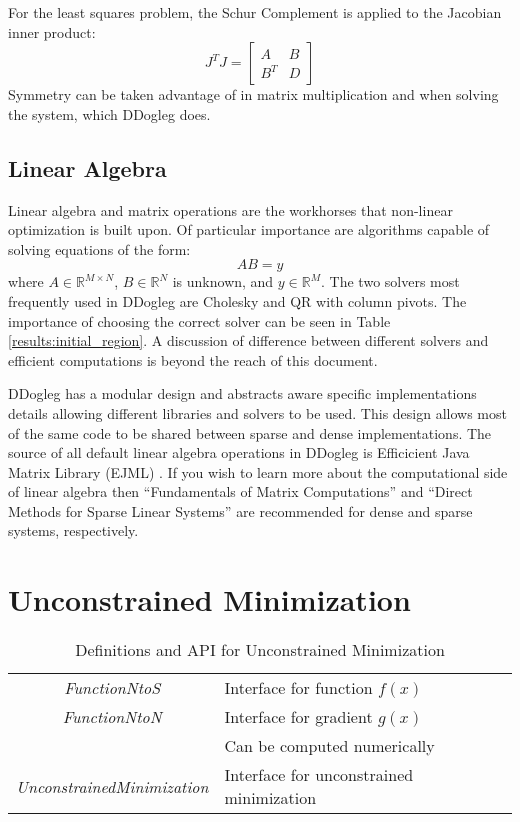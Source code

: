 \documentclass[peerreview,compsoc,onecolumn]{IEEEtran}
\newcommand{\R}{\mathbb{R}}
\begin{document}
For the least squares problem, the Schur Complement is applied to the Jacobian inner product:
\begin{equation}
J^T J =
\begin{bmatrix}
A & B \\
B^T & D
\end{bmatrix}
\end{equation}
Symmetry can be taken advantage of in matrix multiplication and when solving the system, which DDogleg does.

\subsection{Linear Algebra}

Linear algebra and matrix operations are the workhorses that non-linear optimization is built upon. Of particular importance are algorithms capable of solving equations of the form:
\begin{equation}
AB = y
\end{equation}
where $A \in \R^{M \times N}$, $B \in \R^N$ is unknown, and $y \in \R^M$. The two solvers most frequently used in DDogleg are Cholesky and QR with column pivots. The importance of choosing the correct solver can be seen in Table \ref{results:initial_region}. A discussion of difference between different solvers and efficient computations is beyond the reach of this document.

DDogleg has a modular design and abstracts aware specific implementations details allowing different libraries and solvers to be used. This design allows most of the same code to be shared between sparse and dense implementations. The source of all default linear algebra operations in DDogleg is Efficicient Java Matrix Library (EJML) \cite{ejml2018}. If you wish to learn more about the computational side of linear algebra then ``Fundamentals of Matrix Computations'' \cite{watkins2010} and ``Direct Methods for Sparse Linear Systems'' \cite{davis2006} are recommended for dense and sparse systems, respectively.

\section{Unconstrained Minimization}

\begin{table}[h]
\centering
\caption{\label{definitions:UM}Definitions and API for Unconstrained Minimization}
\begin{tabular}{cl}
\textit{FunctionNtoS} & Interface for function $f(x)$ \\
\textit{FunctionNtoN} & Interface for gradient $g(x)$ \\
& Can be computed numerically \\
\textit{UnconstrainedMinimization} & Interface for unconstrained minimization
\end{tabular}
\end{table}
\end{document}
